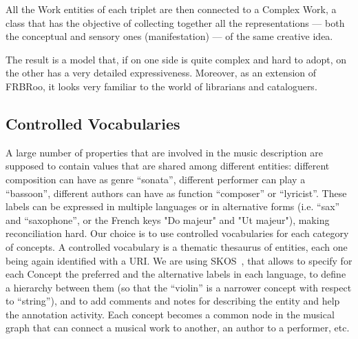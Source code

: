 All the Work entities of each triplet are then connected to a Complex Work, a class that has the objective of collecting together all the representations --- both the conceptual and sensory ones (manifestation) --- of the same creative idea.

The result is a model that, if on one side is quite complex and hard to adopt, on the other has a very detailed expressiveness. Moreover, as an extension of FRBRoo, it looks very familiar to the world of librarians and cataloguers.

\subsection{Controlled Vocabularies}
A large number of properties that are involved in the music description are supposed to contain values that are shared among different entities: different composition can have as genre ``sonata'', different performer can play a ``bassoon'', different authors can have as function ``composer'' or ``lyricist''. These labels can be expressed in multiple languages or in alternative forms (i.e. ``sax'' and ``saxophone'', or the French keys "Do majeur" and "Ut majeur"), making reconciliation hard. Our choice is to use controlled vocabularies for each category of concepts. A controlled vocabulary is a thematic thesaurus of entities, each one being again identified with a URI. We are using SKOS~\cite{miles2007skos}, that allows to specify for each Concept the preferred and the alternative labels in each language, to define a hierarchy between them (so that the ``violin'' is a narrower concept with respect to ``string''), and to add comments and notes for describing the entity and help the annotation activity. Each concept becomes a common node in the musical graph that can connect a musical work to another, an author to a performer, etc.

